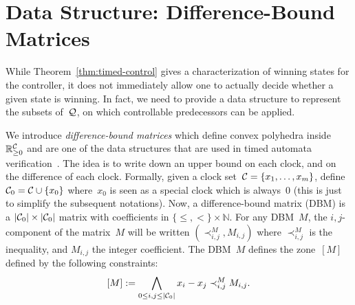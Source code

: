 \documentclass{article}
\begin{document}
\section{Data Structure: Difference-Bound Matrices}
While Theorem~\cref{thm:timed-control} gives a characterization of winning states for the
controller, it does not immediately allow one to actually decide whether a given
state is winning. In fact, we need to provide a data structure to represent the
subsets of~$\mathcal{Q}$, on which controllable predecessors can be applied.

We introduce \emph{difference-bound matrices} which define convex polyhedra inside $\mathbb{R}_{\geq 0}^{\mathcal{C}}$
and are one of the data structures that are used in timed automata
verification~\cite{Dil90,BM83}. The idea is to write down an upper bound
on each clock, and on the difference of each clock. Formally, given a clock
set~$\mathcal{C}=\{x_1,\ldots,x_m\}$, define $\mathcal{C}_0 = \mathcal{C} \cup \{x_0\}$
where~$x_0$ is seen as a
special clock which is always~$0$ (this is just to simplify the subsequent notations). Now,
a difference-bound matrix (DBM) is a $|\mathcal{C}_0|\times |\mathcal{C}_0|$ matrix
with coefficients in $\{\leq,<\} \times \mathbb{N}$. For any DBM~$M$, 
the $i,j$-component of the matrix~$M$ will be written
$(\prec^M_{i,j}, M_{i,j})$ where $\prec^M_{i,j}$ is the inequality, and
$M_{i,j}$ the integer coefficient. The DBM~$M$ defines the zone~$[M]$ defined by
the following constraints:
\[
  [M] := \bigwedge_{0\leq i,j \leq |\mathcal{C}_0|} x_i-x_j \prec^M_{i,j} M_{i,j}.
\]
\end{document}
